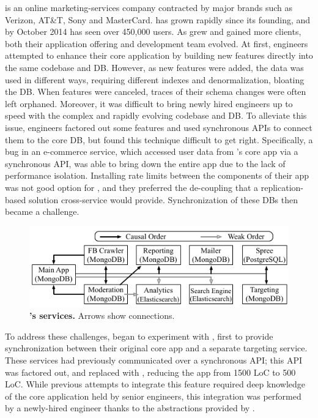 \crowdtap is an online marketing-services company contracted by major brands such as Verizon, AT\&T, Sony and MasterCard.
\crowdtap has grown rapidly since its founding, and by October 2014 has seen over 450,000 users.
As \crowdtap grew and gained more clients, both their application offering and development team evolved.
At first, engineers attempted to enhance their core application by building new features directly into the same codebase and DB.
However, as new features were added, the data was used in different ways, requiring different indexes and denormalization, bloating the DB.
When features were canceled, traces of their schema changes were often left orphaned.
Moreover, it was difficult to bring newly hired engineers up to speed with the complex and rapidly evolving codebase and DB.
To alleviate this issue, engineers factored out some features and used synchronous APIs to connect them to the core DB, but found this technique difficult to
get right.
Specifically, a bug in an e-commerce service, which accessed user data from
\crowdtap's core app via a synchronous API, was able to bring down the entire app due to
the lack of performance isolation.  Installing rate limits between the components
of their app was not good option for \crowdtap, and they preferred the
de-coupling that a replication-based solution cross-service would provide.
Synchronization of these DBs then became a challenge.

\begin{figure}[t]
  \centering
  \includegraphics[width=\linewidth]{figures/synapse/eco-crowdtap.pdf}
  \caption{\textbf{\crowdtap's services.} Arrows show \synapse connections.}
  \label{synapse:fig:crowdtap-ecosystem}
\end{figure}

To address these challenges, \crowdtap began to experiment with \synapse,
first to provide synchronization between their original core app and a separate
targeting service.  These services had previously communicated over a
synchronous API; this API was factored out, and replaced with \synapse,
reducing the app from 1500 LoC to 500 LoC.  While previous attempts to integrate
this feature required deep knowledge of the core application held by senior
engineers, this integration was performed by a newly-hired engineer thanks to the abstractions provided by \synapse.

